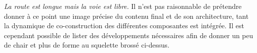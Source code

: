 %
%
%


\emph{La route est longue mais la voie est libre.} Il n'est pas raisonnable de prétendre donner à ce point une image précise du contenu final et de son architecture, tant la dynamique de co-construction des différentes composantes est intégrée. Il est cependant possible de lister des développements nécessaires afin de donner un peu de chair et plus de forme au squelette brossé ci-dessus.

